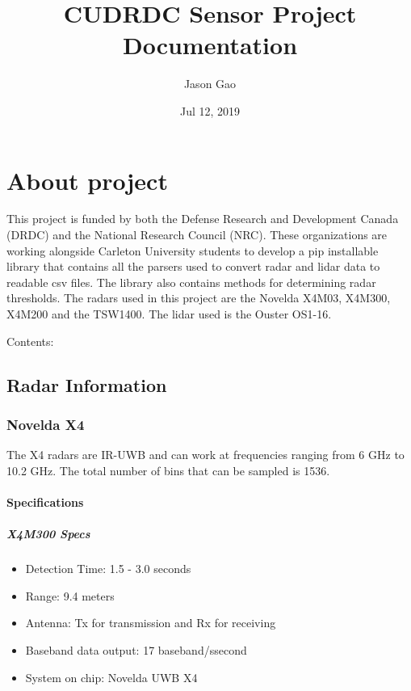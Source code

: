 \documentclass[letterpaper,10pt,english]{sphinxmanual}
\title{CUDRDC Sensor Project Documentation}
\date{Jul 12, 2019}
\author{Jason Gao}
\begin{document}
\pagestyle{empty}
\sphinxmaketitle
\pagestyle{plain}
\sphinxtableofcontents
\pagestyle{normal}
\label{\detokenize{index::doc}}



\chapter{About project}
\label{\detokenize{index:about-project}}
This project is funded by both the Defense Research and Development Canada (DRDC) and the National Research Council (NRC). These organizations are working alongside Carleton University students
to develop a pip installable library that contains all the parsers used to convert radar and lidar data to readable csv files. The library also contains methods for determining radar thresholds.
The radars used in this project are the Novelda X4M03, X4M300, X4M200 and the TSW1400. The lidar used is the Ouster OS1-16.

Contents:


\section{Radar Information}
\label{\detokenize{Radar information:radar-information}}\label{\detokenize{Radar information::doc}}

\subsection{Novelda X4}
\label{\detokenize{Radar information:novelda-x4}}
The X4 radars are IR-UWB and can work at frequencies ranging from 6 GHz to 10.2 GHz. The total number of bins that can be sampled is 1536.


\subsubsection{Specifications}
\label{\detokenize{Radar information:specifications}}

\paragraph{X4M300 Specs}
\label{\detokenize{Radar information:x4m300-specs}}\begin{itemize}
\item {} 
Detection Time: 1.5 - 3.0 seconds

\item {} 
Range: 9.4 meters

\item {} 
Antenna: Tx for transmission and Rx for receiving

\item {} 
Baseband data output: 17 baseband/ssecond

\item {} 
System on chip: Novelda UWB X4

\end{itemize}
\end{document}
